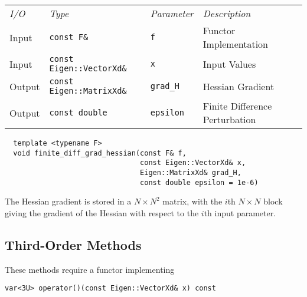 \begin{tcolorbox}[colback=white,colframe=gray90, coltitle=black,boxrule=3pt,
fonttitle=\bfseries,title=Finite Difference Hessian Gradient]

\begin{tabular}{llll}
\textit{I/O} & \textit{Type} & \textit{Parameter} & \textit{Description} \\
Input & \texttt{const F\&} & \texttt{f} & Functor Implementation \\
Input & \texttt{const Eigen::VectorXd\&} & \texttt{x} & Input Values \\
Output & \texttt{const Eigen::MatrixXd\&} & \texttt{grad\_H} & Hessian Gradient \\
Output & \texttt{const double} & \texttt{epsilon} & Finite Difference Perturbation
\end{tabular}

\vspace{5mm}

\begin{verbatim}
  template <typename F>
  void finite_diff_grad_hessian(const F& f,
                                const Eigen::VectorXd& x,
                                Eigen::MatrixXd& grad_H,
                                const double epsilon = 1e-6)
\end{verbatim}

\vspace{5mm}

The Hessian gradient is stored in a $N \times N^{2}$ matrix, with the $i$th
$N \times N$ block giving the gradient of the Hessian with respect to the
$i$th input parameter.

\end{tcolorbox}

\subsection{Third-Order Methods}

These methods require a functor implementing
%
\begin{verbatim}
var<3U> operator()(const Eigen::VectorXd& x) const
\end{verbatim}


